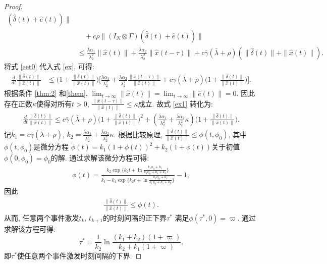 \begin{proof}
\begin{align}
        (\hat{{\delta}}(t)+\hat{e}(t))\|\\
        \nonumber&\quad+c\rho\|(I_N\otimes\Gamma)(\hat{{\delta}}(t)+\hat{e}(t))\|\\
        &\leq\frac{\bar{\lambda}\alpha_1}{\lambda_2^2}\|\hat{x}(t)\|+\frac{\bar{\lambda}\alpha_2}{\lambda_2^2}\|\hat{x}(t-\tau)\|
        +c\bar{\gamma}(\bar{\lambda}+\rho)(\|\hat{{\delta}}(t)\|+\|\hat{x}(t)\|).
        \end{align}
        将式 \eqref{eet0} 代入式 \eqref{ex}, 可得:
         \begin{align}\label{ex1}
        \frac{d}{dt}\frac{\|\hat{{\delta}}(t)\|}{\|\hat{x}(t)\|}&\leq\Big(1+\frac{\|\hat{{\delta}}(t)\|}{\|\hat{x}(t)\|}\Big)
        \Bigg[\frac{\bar{\lambda}\alpha_1}{\lambda_2^2}+\frac{\bar{\lambda}\alpha_2}{\lambda_2^2}\frac{\|\hat{x}(t-\tau)\|}{\|\hat{x}(t)\|}
        +c\bar{\gamma}(\bar{\lambda}+\rho)\Big(1+\frac{\|\hat{{\delta}}(t)\|}{\|\hat{x}(t)\|}\Big)\Bigg].
        \end{align}
        根据条件 \eqref{thm:2} 和\autoref{them}, $\lim_{t\rightarrow \infty}\|\hat{x}(t)\|=\lim_{t\rightarrow \infty}\|\hat{e}(t)\|=0$. 因此存在正数$\kappa$使得对所有$t>0$, $\frac{\|\hat{x}(t-\tau)\|}{\|\hat{x}(t)\|}\leq \kappa$成立. 故式 \eqref{ex1} 转化为:
        \begin{align}\label{ax2}
        \frac{d}{dt}\frac{\|\hat{{\delta}}(t)\|}{\|\hat{x}(t)\|}\leq c\bar{\gamma}(\bar{\lambda}+\rho)\Big(1+\frac{\|\hat{{\delta}}(t)\|}{\|\hat{x}(t)\|}\Big)^2
        +(\frac{\bar{\lambda}\alpha_1}{\lambda_2^2}
        +\frac{\bar{\lambda}\alpha_2}{\lambda_2^2}\kappa)\Big(1+\frac{\|\hat{{\delta}}(t)\|}{\|\hat{x}(t)\|}\Big).
        \end{align}
        记$k_1=c\bar{\gamma}(\bar{\lambda}+\rho)$, $k_2=\frac{\bar{\lambda}\alpha_1}{\lambda_2^2}
        +\frac{\bar{\lambda}\alpha_2}{\lambda_2^2}\kappa$.
        根据比较原理, $\frac{\|\hat{{\delta}}(t)\|}{\|\hat{x}(t)\|}\leq\phi(t,\phi_0)$, 其中$\phi(t,\phi_0)$是微分方程 $\dot{\phi}(t)=k_1(1+\phi(t))^2+k_2(1+\phi(t))$关于初值$\phi(0,\phi_0)=\phi_0$的解. 通过求解该微分方程可得:
        \begin{align}
        \phi(t)=\frac{k_2\exp\big\{k_2t+\ln\frac{k_1\phi_0+k_1}{k_1\phi_0+k_1+k_2}\big\}}{k_1-k_1\exp\big\{k_2t+\ln\frac{k_1\phi_0+k_1}{k_1\phi_0+k_1+k_2}\big\}}-1,
        \end{align}
        因此
        \begin{align}
        \frac{\|\hat{\delta}(t)\|}{\|\hat{x}(t)\|}\leq\phi(t).
        \end{align}
        从而, 任意两个事件激发$t_k$, $t_{k+1}$的时刻间隔的正下界$\tau^*$ 满足$\phi(\tau^*,0)=\varpi$. 通过求解该方程可得:
        $$\tau^*=\frac{1}{k_2}\ln\frac{(k_1+k_2)(1+\varpi)}{k_2+k_1(1+\varpi)}.$$
        即$\tau^*$使任意两个事件激发时刻间隔的下界.
        \end{proof}


